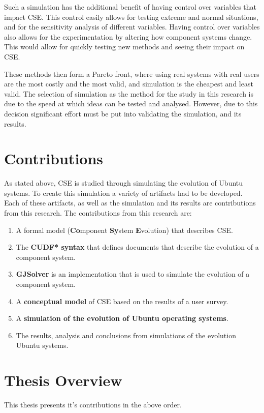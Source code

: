 Such a simulation has the additional benefit of having control over variables that impact CSE.
This control easily allows for testing extreme and normal situations,
and for the sensitivity analysis of different variables.
Having control over variables also allows for the experimentation by altering how component systems change.
This would allow for quickly testing new methods and seeing their impact on CSE.

These methods then form a Pareto front, where using real systems with real users are the most costly and the most valid, 
and simulation is the cheapest and least valid.
The selection of simulation as the method for the study in this research is due to the speed at which ideas can be tested and analysed.
However, due to this decision significant effort must be put into validating the simulation, and its results. 

\section{Contributions}
As stated above, CSE is studied through simulating the evolution of Ubuntu systems.
To create this simulation a variety of artifacts had to be developed.
Each of these artifacts, as well as the simulation and its results are contributions from this research. 
The contributions from this research are:
\begin{enumerate}
  \item A formal model \textbf{\modelname} (\textbf{Co}mponent \textbf{Sy}stem \textbf{E}volution) that describes CSE. 
  \item The \textbf{CUDF* syntax} that defines documents that describe the evolution of a component system.
  \item \textbf{GJSolver} is an implementation that is used to simulate the evolution of a component system.
  \item A \textbf{conceptual model} of CSE based on the results of a user survey. 
  \item A \textbf{simulation of the evolution of Ubuntu operating systems}.
  \item The results, analysis and conclusions from simulations of the evolution Ubuntu systems.
\end{enumerate}

\section{Thesis Overview}
This thesis presents it's contributions in the above order.

